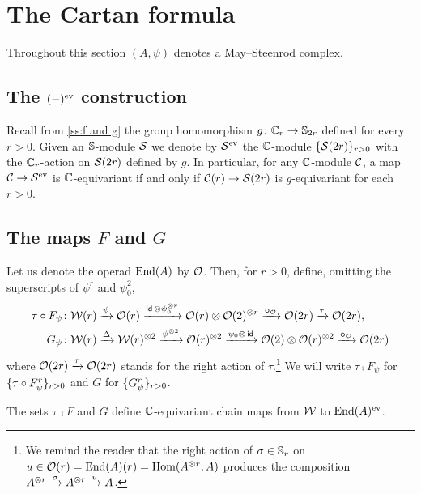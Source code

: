 
\section{The Cartan formula}\label{s:cartan}

\noindent Throughout this section $(A,\psi)$ denotes a May--Steenrod complex.

\subsection{The $(-)^{\mathrm{ev}}$ construction}

Recall from \cref{ss:f and g} the group homomorphism $g \colon \mathbb{C}_r \to \mathbb{S}_{2r}$ defined for every $r > 0$.
Given an $\mathbb{S}$-module $\mathcal{S}$ we denote by $\mathcal{S}^{\mathrm{ev}}$ the $\mathbb{C}$-module $\{\mathcal{S}(2r)\}_{r>0}$ with the $\mathbb{C}_r$-action on $\mathcal{S}(2r)$ defined by $g$.
In particular, for any $\mathbb{C}$-module $\mathcal{C}$, a map $\mathcal{C} \to \mathcal{S}^{\mathrm{ev}}$ is $\mathbb{C}$-equivariant if and only if $\mathcal{C}(r) \to \mathcal{S}(2r)$ is $g$-equivariant for each $r > 0$.

\subsection{The maps $F$ and $G$}

Let us denote the operad $\mathrm{End}(A)$ by $\mathcal{O}$.
Then, for $r > 0$, define, omitting the superscripts of $\psi^r$ and $\psi_0^2$,
\begin{align*}
	\tau \mathbin{\circ} F_\psi \colon& \mathcal{W}(r) \xrightarrow{\psi} \mathcal{O}(r) \xrightarrow{\mathsf{id}\, \otimes \psi_0^{\otimes r}}
	\mathcal{O}(r) \otimes \mathcal{O}(2)^{\otimes r} \xrightarrow{\bm{\mathbin{\circ}}_{\mathcal{O}}}
	\mathcal{O}(2r) \xrightarrow{\tau} \mathcal{O}(2r), \\
	G_\psi \colon& \mathcal{W}(r) \xrightarrow{\Delta}
	\mathcal{W}(r)^{\otimes 2} \xrightarrow{\psi^{\otimes 2}}
	\mathcal{O}(r)^{\otimes 2} \xrightarrow{\psi_0 \otimes\, \mathsf{id}}
	\mathcal{O}(2) \otimes \mathcal{O}(r)^{\otimes 2} \xrightarrow{\bm{\mathbin{\circ}}_{\mathcal{O}}}
	\mathcal{O}(2r)
\end{align*}
where $\mathcal{O}(2r) \xrightarrow{\tau} \mathcal{O}(2r)$ stands for the right action of $\tau$.\footnote{
We remind the reader that the right action of $\sigma \in \mathbb{S}_r$ on $u \in \mathcal{O}(r) = \mathrm{End}(A)(r) = \mathrm{Hom}(A^{\otimes r}, A)$ produces the composition $A^{\otimes r} \xrightarrow{\sigma} A^{\otimes r} \xrightarrow{u} A$.\label{fn:symmetric_action_on_hom}
}
We will write $\tau \comp F_\psi$ for $\{\tau \mathbin{\circ} F_\psi^r\}_{r>0}$ and $G$ for $\{G_\psi^r\}_{r>0}$.

\begin{lemma*}
	The sets $\tau\, \comp F$ and $G$ define $\mathbb{C}$-equivariant chain maps from $\mathcal{W}$ to $\mathrm{End}(A)^{\mathrm{ev}}$.
\end{lemma*}

